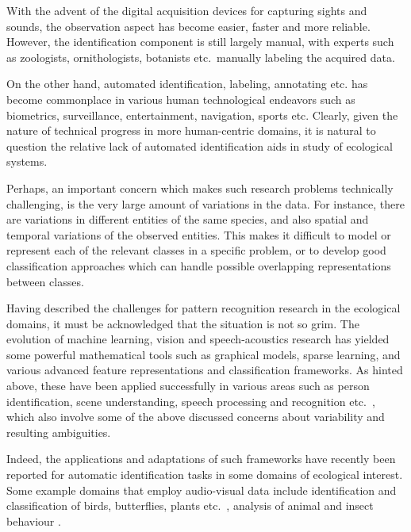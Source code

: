 \documentclass{article}
\begin{document}
With the advent of the digital acquisition devices for capturing sights and
sounds, the observation aspect has become easier, faster and more reliable.
However, the identification component is still largely manual, with experts such
as zoologists, ornithologists, botanists etc.~manually labeling the acquired data. 

On the other hand, automated identification, labeling, annotating etc. has
become commonplace in various human technological endeavors such as biometrics,
surveillance, entertainment, navigation, sports etc. Clearly, given the nature
of technical progress in more human-centric domains, it is natural to question
the relative lack of automated identification aids in study of ecological
systems. 

Perhaps, an important concern 
which makes such research problems technically challenging, is the very large
amount of variations in the data. For instance, there are variations in
different entities of the same species, and also spatial and temporal variations
of the observed entities. This makes it difficult to model or represent each of
the relevant classes in a specific problem, or to develop good classification
approaches which can handle possible overlapping representations between
classes.

Having described the challenges for pattern recognition research in the
ecological domains, it must be acknowledged that the situation is not so grim.
The evolution of machine learning, vision and speech-acoustics research has
yielded some powerful mathematical tools such as graphical models, sparse
learning, and various advanced feature representations and classification
frameworks. 
As hinted above, these have been applied successfully in various areas such as
person identification, scene understanding, speech processing and recognition
etc.~, which also involve some of the above discussed concerns about variability
and resulting ambiguities. 

Indeed, the applications and adaptations of such frameworks have recently been
reported for automatic identification tasks in some domains of ecological
interest. Some example domains that employ audio-visual data include
identification and classification of birds, butterflies, plants etc.~, analysis
of animal and insect behaviour
\cite{leaf,butterfly,hierarchy,poof,brandes_automatedSoundRecording2008}. 
\end{document}
